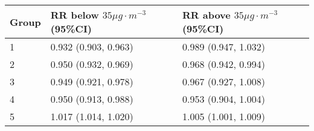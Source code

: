 \begin{tabular}{lll}
  \hline
Group & RR below $35 \mu g \cdot m^{-3}$ (95\%CI) & RR above $35 \mu g \cdot m^{-3}$ (95\%CI) \\ 
  \hline
   1 & 0.932 (0.903, 0.963) & 0.989 (0.947, 1.032) \\ 
     2 & 0.950 (0.932, 0.969) & 0.968 (0.942, 0.994) \\ 
     3 & 0.949 (0.921, 0.978) & 0.967 (0.927, 1.008) \\ 
     4 & 0.950 (0.913, 0.988) & 0.953 (0.904, 1.004) \\ 
     5 & 1.017 (1.014, 1.020) & 1.005 (1.001, 1.009) \\ 
   \hline
\end{tabular}

